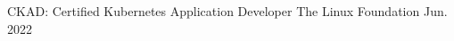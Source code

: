 

\begin{cvhonors}

  \cvhonor
    {CKAD: Certified Kubernetes Application Developer} %
    {The Linux Foundation} %
    {} %
    {Jun. 2022} %

\end{cvhonors}
